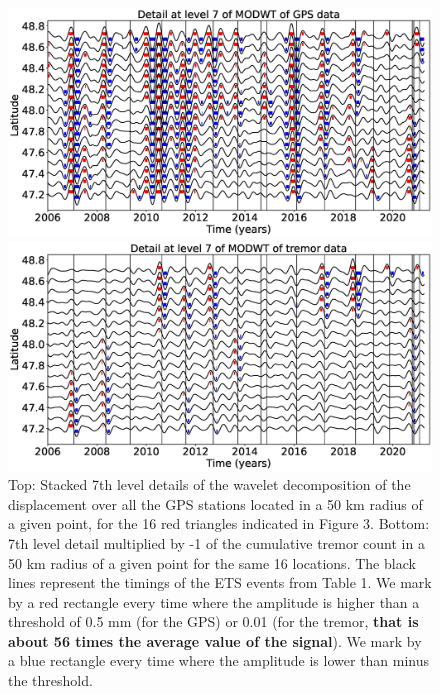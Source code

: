 \documentclass{article}
\begin{document}
\begin{figure}
\noindent\includegraphics[width=\textwidth, trim={0cm 0cm 0cm 0cm},clip]{figures/GPS_longer_detail_7.eps}

\noindent\includegraphics[width=\textwidth, trim={0cm 0cm 0cm 0cm},clip]{figures/tremor_longer_detail_7.eps}
\caption{Top: Stacked 7th level details of the wavelet decomposition of the displacement over all the GPS stations located in a 50 km radius of a given point, for the 16 red triangles indicated in Figure 3. Bottom: 7th level detail multiplied by -1 of the cumulative tremor count in a 50 km radius of a given point for the same 16 locations. The black lines represent the timings of the ETS events from Table 1. We mark by a red rectangle every time where the amplitude is higher than a threshold of 0.5 mm (for the GPS) or 0.01 (for the tremor, \textbf{that is about 56 times the average value of the signal}). We mark by a blue rectangle every time where the amplitude is lower than minus the threshold.}
\label{pngfiguresample}
\end{figure}
\end{document}
